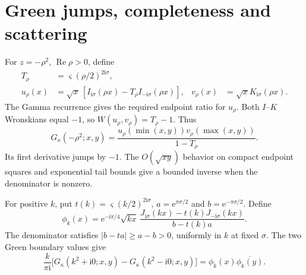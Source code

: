 \documentclass[10pt]{article}
\newcommand{\ii}{\mathrm i}
\newcommand{\e}{\mathrm e}
\DeclareMathOperator{\Ree}{Re}
\begin{document}
\section{Green jumps, completeness and scattering}
For $z=-\rho^2$, $\Ree\rho>0$, define
\begin{align}
 T_\rho&=\varsigma(\rho/2)^{2\ii\sigma},\nonumber\\
 u_\rho(x)&=\sqrt x\,[I_{\ii\sigma}(\rho x)-T_\rho I_{-\ii\sigma}(\rho x)],
 &v_\rho(x)&=\sqrt xK_{\ii\sigma}(\rho x).\label{eq:uv}
\end{align}
The Gamma recurrence gives the required endpoint ratio for $u_\rho$.
Both $I$--$K$ Wronskians equal $-1$, so
$W(u_\rho,v_\rho)=T_\rho-1$. Thus
\begin{equation}
 G_\kappa(-\rho^2;x,y)=
 \frac{u_\rho(\min(x,y))v_\rho(\max(x,y))}{1-T_\rho}.
 \label{eq:green}
\end{equation}
Its first derivative jumps by $-1$. The $O(\sqrt{xy})$ behavior on compact
endpoint squares and exponential tail bounds give a bounded inverse when
the denominator is nonzero.

For positive $k$, put $t(k)=\varsigma(k/2)^{2\ii\sigma}$,
$a=\e^{\pi\sigma/2}$ and $b=\e^{-\pi\sigma/2}$. Define
\begin{equation}
 \phi_k(x)=\e^{-\ii\pi/4}\sqrt{kx}\,
 \frac{J_{\ii\sigma}(kx)-t(k)J_{-\ii\sigma}(kx)}{b-t(k)a}.
 \label{eq:phi}
\end{equation}
The denominator satisfies $|b-ta|\ge a-b>0$, uniformly in $k$ at fixed
$\sigma$. The two Green boundary values give
\begin{equation}
 \frac{k}{\pi\ii}\big[G_\kappa(k^2+\ii0;x,y)-G_\kappa(k^2-\ii0;x,y)\big]
 =\phi_k(x)\overline{\phi_k(y)}.
 \label{eq:stone}
\end{equation}
\end{document}
